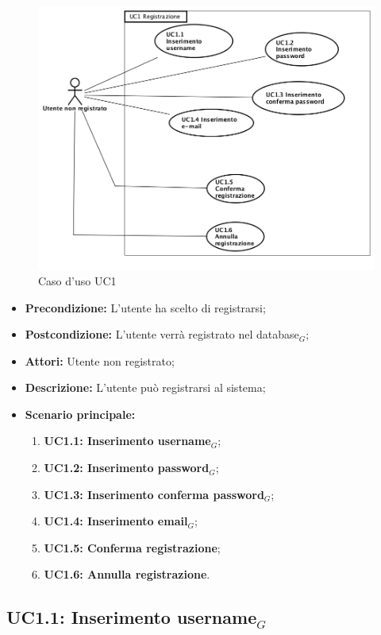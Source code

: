 \begin{figure}[h]
	\begin{center}
	\includegraphics[scale=0.4]{diagram/UC1.png}
	\caption{Caso d'uso UC1}
	\end{center}
\end{figure}
\begin{itemize}
	\item \textbf{Precondizione:} L'utente ha scelto di registrarsi;
	\item \textbf{Postcondizione:} L'utente verrà registrato nel database$_G$;
	\item \textbf{Attori:} Utente non registrato;
	\item \textbf{Descrizione:} L'utente può registrarsi al sistema;
	\item \textbf{Scenario principale:}
	\begin{enumerate}
		\item \textbf{ UC1.1: Inserimento username$_G$};
		\item \textbf{ UC1.2: Inserimento password$_G$};
		\item \textbf{ UC1.3: Inserimento conferma password$_G$};
		\item \textbf{ UC1.4: Inserimento email$_G$};
		\item \textbf{ UC1.5: Conferma registrazione};
		\item \textbf{ UC1.6: Annulla registrazione}.
	\end{enumerate}
\end{itemize}
\subsection{ UC1.1: Inserimento username$_G$}

